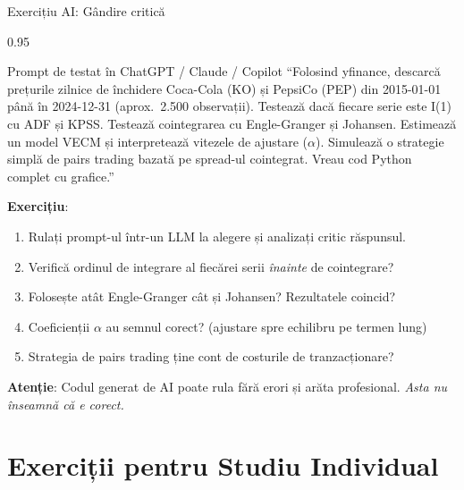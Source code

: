 \documentclass[9pt, aspectratio=169, t]{beamer}
\begin{document}
\begin{frame}{Exercițiu AI: Gândire critică}
    \begin{cminipage}{0.95\textwidth}
    \vspace{-3mm}
    \begin{block}{\footnotesize Prompt de testat în ChatGPT / Claude / Copilot}
        {\footnotesize
        ``Folosind yfinance, descarcă prețurile zilnice de închidere Coca-Cola (KO) și PepsiCo (PEP) din 2015-01-01 până în 2024-12-31 (aprox.\ 2.500 observații). Testează dacă fiecare serie este I(1) cu ADF și KPSS. Testează cointegrarea cu Engle-Granger și Johansen. Estimează un model VECM și interpretează vitezele de ajustare ($\alpha$). Simulează o strategie simplă de pairs trading bazată pe spread-ul cointegrat. Vreau cod Python complet cu grafice.''
        }
    \end{block}
    \vspace{-2mm}
    {\footnotesize
    \textbf{Exercițiu}:
    \begin{enumerate}\setlength{\itemsep}{0pt}
        \item Rulați prompt-ul într-un LLM la alegere și analizați critic răspunsul.
        \item Verifică ordinul de integrare al fiecărei serii \textit{înainte} de cointegrare?
        \item Folosește atât Engle-Granger cât și Johansen? Rezultatele coincid?
        \item Coeficienții $\alpha$ au semnul corect? (ajustare spre echilibru pe termen lung)
        \item Strategia de pairs trading ține cont de costurile de tranzacționare?
    \end{enumerate}
    }
    \vspace{-2mm}
    \begin{alertblock}{}
        {\footnotesize \textbf{Atenție}: Codul generat de AI poate rula fără erori și arăta profesional. \textit{Asta nu înseamnă că e corect.}}
    \end{alertblock}
    \end{cminipage}
\end{frame}

\section{Exerciții pentru Studiu Individual}
\end{document}
